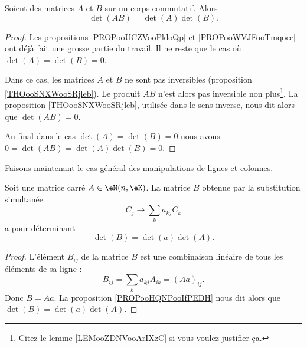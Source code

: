\begin{proposition}     \label{PROPooHQNPooIfPEDH}
    Soient des matrices \( A\) et \( B\) sur un corps commutatif. Alors
    \begin{equation}
        \det(AB)=\det(A)\det(B).
    \end{equation}
\end{proposition}

\begin{proof}
    Les propositions \ref{PROPooUCZVooPkloQp} et \ref{PROPooWVJFooTmqoec} ont déjà fait une grosse partie du travail. Il ne reste que le cas où \( \det(A)=\det(B)=0\).

    Dans ce cas, les matrices \( A\) et \( B\) ne sont pas inversibles (proposition \ref{THOooSNXWooSRjleb}). Le produit \( AB\) n'est alors pas inversible non plus\footnote{Citez le lemme \ref{LEMooZDNVooArIXzC} si vous voulez justifier ça.}. La proposition \ref{THOooSNXWooSRjleb}, utilisée dans le sens inverse, nous dit alors que \( \det(AB)=0\).

    Au final dans le cas \( \det(A)=\det(B)=0\) nous avons \( 0=\det(AB)=\det(A)\det(B)=0\).
\end{proof}

Faisons maintenant le cas général des manipulations de lignes et colonnes.

\begin{proposition}     \label{PROPooSLLGooSZjQrv}
    Soit une matrice carré \( A\in \eM(n,\eK)\). La matrice \( B\) obtenue par la substitution simultanée
    \begin{equation}
        C_j\to \sum_ka_{kj}C_k
    \end{equation}
    a pour déterminant
    \begin{equation}
        \det(B)=\det(a)\det(A).
    \end{equation}
\end{proposition}

\begin{proof}
    L'élément \( B_{ij}\) de la matrice \( B\) est une combinaison linéaire de tous les éléments de sa ligne :
    \begin{equation}
        B_{ij}=\sum_ka_{kj}A_{ik}=(Aa)_{ij}.
    \end{equation}
    Donc \( B=Aa\). La proposition \ref{PROPooHQNPooIfPEDH} nous dit alors que \( \det(B)=\det(a)\det(A)\).
\end{proof}

